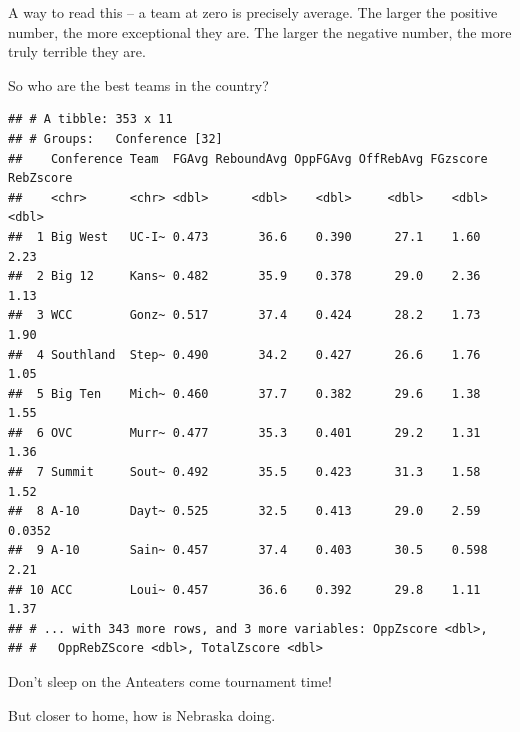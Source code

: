 \documentclass[]{book}
\newenvironment{Shaded}{\begin{snugshade}}{\end{snugshade}}
\newcommand{\KeywordTok}[1]{\textcolor[rgb]{0.13,0.29,0.53}{\textbf{#1}}}
\newcommand{\NormalTok}[1]{#1}
\newcommand{\OperatorTok}[1]{\textcolor[rgb]{0.81,0.36,0.00}{\textbf{#1}}}
\newcommand{\StringTok}[1]{\textcolor[rgb]{0.31,0.60,0.02}{#1}}
\begin{document}
A way to read this -- a team at zero is precisely average. The larger the positive number, the more exceptional they are. The larger the negative number, the more truly terrible they are.

So who are the best teams in the country?

\begin{Shaded}
\end{Shaded}

\begin{verbatim}
## # A tibble: 353 x 11
## # Groups:   Conference [32]
##    Conference Team  FGAvg ReboundAvg OppFGAvg OffRebAvg FGzscore RebZscore
##    <chr>      <chr> <dbl>      <dbl>    <dbl>     <dbl>    <dbl>     <dbl>
##  1 Big West   UC-I~ 0.473       36.6    0.390      27.1    1.60     2.23  
##  2 Big 12     Kans~ 0.482       35.9    0.378      29.0    2.36     1.13  
##  3 WCC        Gonz~ 0.517       37.4    0.424      28.2    1.73     1.90  
##  4 Southland  Step~ 0.490       34.2    0.427      26.6    1.76     1.05  
##  5 Big Ten    Mich~ 0.460       37.7    0.382      29.6    1.38     1.55  
##  6 OVC        Murr~ 0.477       35.3    0.401      29.2    1.31     1.36  
##  7 Summit     Sout~ 0.492       35.5    0.423      31.3    1.58     1.52  
##  8 A-10       Dayt~ 0.525       32.5    0.413      29.0    2.59     0.0352
##  9 A-10       Sain~ 0.457       37.4    0.403      30.5    0.598    2.21  
## 10 ACC        Loui~ 0.457       36.6    0.392      29.8    1.11     1.37  
## # ... with 343 more rows, and 3 more variables: OppZscore <dbl>,
## #   OppRebZScore <dbl>, TotalZscore <dbl>
\end{verbatim}

Don't sleep on the Anteaters come tournament time!

But closer to home, how is Nebraska doing.

\begin{Shaded}
\end{Shaded}
\end{document}
